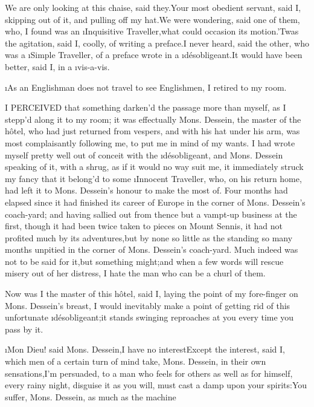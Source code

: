 \documentclass[twoside]{article}
\begin{document}
We are only looking at this chaise, said they.\tsk Your most obedient
servant, said I, skipping out of it, and pulling off my hat.\tsk We were
wondering, said one of them, who, I found was an \i{Inquisitive
Traveller},\tsk what could occasion its motion.\tsk ’Twas the agitation, said I,
coolly, of writing a preface.\tsk I never heard, said the other, who was a
\i{Simple Traveller}, of a preface wrote in a \i{désobligeant}.\tsk It would have
been better, said I, in a \i{vis-a-vis}.

\tsk \i{As an Englishman does not travel to see Englishmen}, I retired to my
room.






I PERCEIVED that something darken’d the passage more than myself, as I
stepp’d along it to my room; it was effectually Mons. Dessein, the master
of the hôtel, who had just returned from vespers, and with his hat under
his arm, was most complaisantly following me, to put me in mind of my
wants.  I had wrote myself pretty well out of conceit with the
\i{désobligeant}, and Mons. Dessein speaking of it, with a shrug, as if it
would no way suit me, it immediately struck my fancy that it belong’d to
some \i{Innocent Traveller}, who, on his return home, had left it to Mons.
Dessein’s honour to make the most of.  Four months had elapsed since it
had finished its career of Europe in the corner of Mons. Dessein’s
coach-yard; and having sallied out from thence but a vampt-up business at
the first, though it had been twice taken to pieces on Mount Sennis, it
had not profited much by its adventures,\tsk but by none so little as the
standing so many months unpitied in the corner of Mons. Dessein’s
coach-yard.  Much indeed was not to be said for it,\tsk but something
might;\tsk and when a few words will rescue misery out of her distress, I
hate the man who can be a churl of them.

\tsk Now was I the master of this hôtel, said I, laying the point of my
fore-finger on Mons. Dessein’s breast, I would inevitably make a point of
getting rid of this unfortunate \i{désobligeant};\tsk it stands swinging
reproaches at you every time you pass by it.

\i{Mon Dieu}! said Mons. Dessein,\tsk I have no interest\tsk Except the interest,
said I, which men of a certain turn of mind take, Mons. Dessein, in their
own sensations,\tsk I’m persuaded, to a man who feels for others as well as
for himself, every rainy night, disguise it as you will, must cast a damp
upon your spirits:\tsk You suffer, Mons. Dessein, as much as the machine\tsk 
\end{document}

